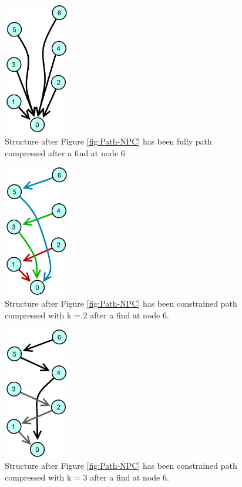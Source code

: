 \documentclass[11pt]{article}
\begin{document}
\begin{figure}[h]
\centering
\includegraphics[width=0.25\textwidth]{FullPathCompression}
\caption{Structure after Figure \ref{fig:Path-NPC} has been fully path compressed after a find at node 6.}
\label{fig:Path-FPC}
\end{figure}

\begin{figure}[h]
\centering
\includegraphics[width=0.25\textwidth]{ContstrainedPathCompression-k2}
\caption{Structure after Figure \ref{fig:Path-NPC} has been constrained path compressed with k = 2 after a find at node 6.}
\label{fig:Path-CPC-k2}
\end{figure}

\begin{figure}[h]
\centering
\includegraphics[width=0.25\textwidth]{ContstrainedPathCompression-k3}
\caption{Structure after Figure \ref{fig:Path-NPC} has been constrained path compressed with k = 3 after a find at node 6.}
\label{fig:Path-CPC-k3}
\end{figure}
\end{document}
